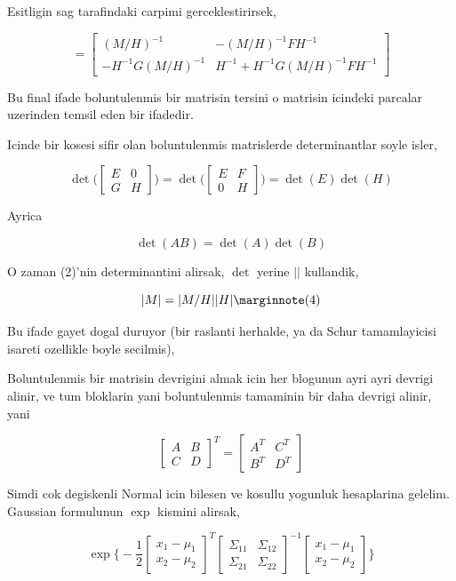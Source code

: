 \documentclass[12pt,fleqn]{article}\usepackage{../common}
\begin{document}
Esitligin sag tarafindaki carpimi gerceklestirirsek, 

\[ =
\left[\begin{array}{rr}
(M/H)^{-1} & -(M/H)^{-1}FH^{-1} \\
-H^{-1}G(M/H)^{-1} & H^{-1}+H^{-1}G(M/H)^{-1}FH^{-1} 
\end{array}\right]
 \]

Bu final ifade boluntulenmis bir matrisin tersini o matrisin icindeki parcalar
uzerinden temsil eden bir ifadedir. 

Icinde bir kosesi sifir olan boluntulenmis matrislerde determinantlar soyle
isler,

\[ 
\det \bigg(
\left[\begin{array}{rr}
E & 0 \\
G & H
\end{array}\right]
\bigg) 
= 
\det \bigg(
\left[\begin{array}{rr}
E & F \\
0 & H
\end{array}\right] 
\bigg) =
\det(E)\det(H)
 \]

Ayrica 

\[ \det(AB) = \det(A)\det(B) \]

O zaman (2)'nin determinantini alirsak, $\det$ yerine $||$ kullandik, 

\[ |M| = |M/H||H| 
\mlabel{4}
\]

Bu ifade gayet dogal duruyor (bir raslanti herhalde, ya da Schur tamamlayicisi 
isareti ozellikle boyle secilmis),

Boluntulenmis bir matrisin devrigini almak icin her blogunun ayri ayri devrigi
alinir, ve tum bloklarin yani boluntulenmis tamaminin bir daha devrigi
alinir, yani

\[ 
\left[\begin{array}{rr}
A & B \\ C & D 
\end{array}\right]^T = 
\left[\begin{array}{rr}
A^T & C^T \\ B^T & D^T
\end{array}\right]
 \]

Simdi cok degiskenli Normal icin bilesen ve kosullu yogunluk hesaplarina
gelelim. Gaussian formulunun $\exp$ kismini alirsak, 

\[ \exp 
\bigg\{ 
-\frac{ 1}{2}
\left[\begin{array}{r}
x_1 - \mu_1\\
x_2 - \mu_2
\end{array}\right]^T
\left[\begin{array}{rr}
\Sigma_{11} & \Sigma_{12}\\
\Sigma_{21} & \Sigma_{22}
\end{array}\right]^{-1}
\left[\begin{array}{r}
x_1 - \mu_1\\
x_2 - \mu_2
\end{array}\right]
\bigg\}
 \]
\end{document}
